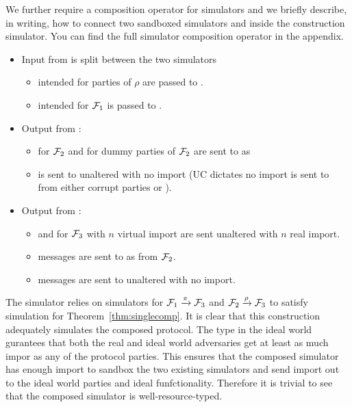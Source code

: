 We further require a composition operator for simulators and we briefly describe, in writing, how to connect two sandboxed simulators \SIM{\rho} and \SIM{\pi} inside the construction simulator.
You can find the full simulator composition operator in the appendix.
\begin{itemize}
	\item Input from \Z is split between the two simulators
	\begin{itemize} 
		\item {} intended for parties of $\rho$ are passed to \SIM{\rho}.
		\item {} intended for $\mathcal{F}_1$ is passed to \SIM{\pi}.
	\end{itemize}
	\item Output from \SIM{\pi}: 
	\begin{itemize}
		\item {} for $\mathcal{F}_2$ and  for dummy parties of $\mathcal{F}_2$ are sent to \SIM{\rho} as 
		\item {} is sent to \Z unaltered with no import (UC dictates no import is sent to \A from either corrupt parties or \F).
	\end{itemize}
	\item Output from \SIM{\rho}: 
	\begin{itemize}
		\item {} and  for $\mathcal{F}_3$ with $n$ virtual import are sent unaltered with $n$ real import.
		\item {} messages are sent to \SIM{\pi} as  from $\mathcal{F}_2$.
		\item {} messages are sent to \Z unaltered with no import.
	\end{itemize}
\end{itemize}
The simulator relies on simulators for $\mathcal{F}_1 \xrightarrow{\pi} \mathcal{F}_3$ and $\mathcal{F}_2 \xrightarrow{\rho} \mathcal{F}_3$ to satisfy simulation for Theorem~\ref{thm:singlecomp}.
It is clear that this construction adequately simulates the composed protocol. 
The type in the ideal world gurantees that both the real and ideal world adversaries get at least as much impor as any of the protocol parties. 
This ensures that the composed simulator has enough import to sandbox the two existing simulators and send import out to the ideal world parties and ideal funfctionality.
Therefore it is trivial to see that the composed simulator is well-resource-typed.

